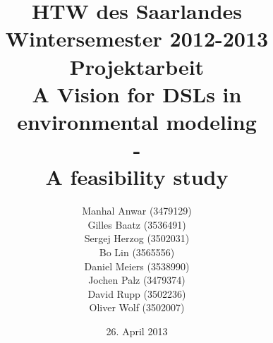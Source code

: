 


\title{%
\large HTW des Saarlandes\\
Wintersemester 2012-2013\\
Projektarbeit\\[10mm]
{\LARGE A Vision for DSLs in environmental modeling}\\
{\LARGE -}\\
{\LARGE A feasibility study}\\[10mm]
}

\author{%
Manhal Anwar (3479129)\\[1mm]
Gilles Baatz (3536491)\\[1mm]
Sergej Herzog (3502031)\\[1mm]
Bo Lin (3565556)\\[1mm]
Daniel Meiers (3538990)\\[1mm]
Jochen Palz (3479374)\\[1mm]
David Rupp (3502236)\\[1mm]
Oliver Wolf (3502007)\\[1mm]
}

\date{26. April 2013}



\maketitle

\tableofcontents
\listoffigures


 













\printbibliography


